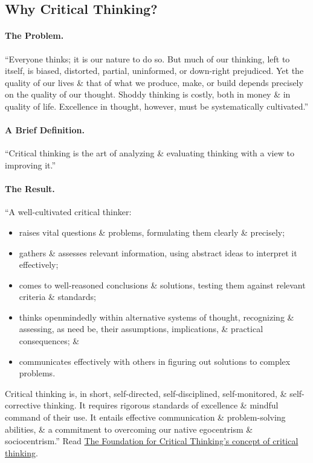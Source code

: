 \documentclass[oneside]{book}
\numberwithin{equation}{section}
\begin{document}
\subsection{Why Critical Thinking?}

\paragraph*{The Problem.} ``Everyone thinks; it is our nature to do so. But much of our thinking, left to itself, is biased, distorted, partial, uninformed, or down-right prejudiced. Yet the quality of our lives \& that of what we produce, make, or build depends precisely on the quality of our thought. Shoddy thinking is costly, both in money \& in quality of life. Excellence in thought, however, must be systematically cultivated.''

\paragraph*{A Brief Definition.} ``Critical thinking is the art of analyzing \& evaluating thinking with a view to improving it.''

\paragraph*{The Result.} ``A well-cultivated critical thinker:
\begin{itemize}
	\item raises vital questions \& problems, formulating them clearly \& precisely;
	\item gathers \& assesses relevant information, using abstract ideas to interpret it effectively;
	\item comes to well-reasoned conclusions \& solutions, testing them against relevant criteria \& standards;
	\item thinks openmindedly within alternative systems of thought, recognizing \& assessing, as need be, their assumptions, implications, \& practical consequences; \&
	\item communicates effectively with others in figuring out solutions to complex problems.
\end{itemize}
Critical thinking is, in short, self-directed, self-disciplined, self-monitored, \& self-corrective thinking. It requires rigorous standards of excellence \& mindful command of their use. It entails effective communication \& problem-solving abilities, \& a commitment to overcoming our native egocentrism \& sociocentrism.'' Read \href{https://www.criticalthinking.org/aboutCT/ourConceptCT.cfm}{The Foundation for Critical Thinking's concept of critical thinking}.
\end{document}
